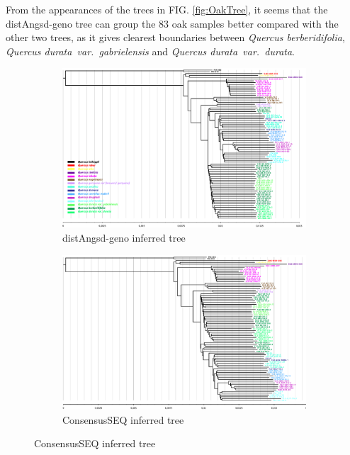 \documentclass{article}
\begin{document}
From the appearances of the trees in FIG. \ref{fig:OakTree}, it seems that the distAngsd-geno tree can group the $83$ oak samples better compared with the other two trees, as it gives clearest boundaries between {\it Quercus berberidifolia}, {\it Quercus durata var. gabrielensis
} and {\it Quercus durata var. durata}. 

\begin{figure}[h]
    \centering
    \begin{subfigure}[b]{0.95\textwidth}
    \includegraphics[width=\textwidth]{matrix_full_nofiltering.in_bionj.t1.png}
    \caption{distAngsd-geno inferred tree}
    \label{fig:distAngsd-genoOakTree}
    \end{subfigure}
    \begin{subfigure}[b]{0.95\textwidth}
    \includegraphics[width=\textwidth]{JCAmatrix_full_nofiltering_SEQ.in_bionj.t.png}
    \caption{ConsensusSEQ inferred tree}
    \label{fig:ConsensusSEQOakTree}
    \end{subfigure}
\end{figure}
\end{document}
